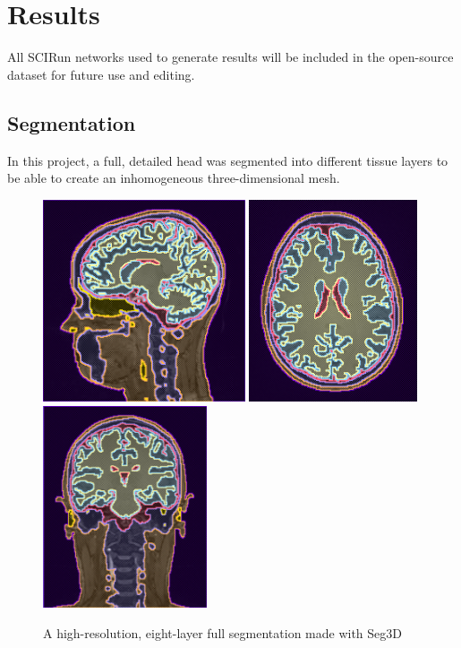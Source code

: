 %

\section{Results}
\label{sec:results}

All SCIRun networks used to generate results will be included in the open-source dataset for future use and editing.

\subsection{Segmentation}

In this project, a full, detailed head was segmented into different tissue layers to be able to create an inhomogeneous three-dimensional mesh. 

\begin{figure}[H]
\begin{center}
\includegraphics[height=2.35in]{Figures/seg_1}
\includegraphics[height=2.35in]{Figures/seg_2}
\includegraphics[height=2.35in]{Figures/seg_3}
\caption{A high-resolution, eight-layer full segmentation made with Seg3D }
\label{fig:fullseg}
\end{center}
\end{figure}

